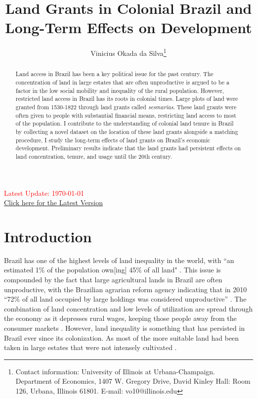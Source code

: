 \documentclass{article}
\title{Land Grants in Colonial Brazil and Long-Term Effects on Development}
\author{Vinicius Okada da Silva\thanks{Contact information: University of Illinois at Urbana-Champaign. Department of Economics, 1407 W. Gregory Drive, David Kinley Hall: Room 126, Urbana, Illinois 61801. E-mail: vo10@illinois.edu}}
\affil{Department of Economics, University of Illinois at Urbana-Champaign}
\date{}
\begin{document}
\maketitle
\thispagestyle{empty} 

\vspace{-.1cm}
\begin{center}
  \textcolor{red}{Latest Update: \today}
  \\
  \href{https://viniokadasilva.github.io/Papers/Sesmarias/02.Draft/02.Second_Draft/Sesmarias_Paper.pdf}{Click here for the Latest Version}
\end{center}
\vspace{.1cm}

\begin{abstract}
  Land access in Brazil has been a key political issue for the past century. The concentration of land in large estates that are often unproductive is argued to be a factor in the low social mobility and inequality of the rural population. However, restricted land access in Brazil has its roots in colonial times. Large plots of land were granted from 1530-1822 through land grants called \textit{sesmarias}. These land grants were often given to people with substantial financial means, restricting land access to most of the population. I contribute to the understanding of colonial land tenure in Brazil by collecting a novel dataset on the location of these land grants alongside a matching procedure, I study the long-term effects of land grants on Brazil's economic development. Preliminary results indicate that the land grants had persistent effects on land concentration, tenure, and usage until the 20th century.
\end{abstract}

\clearpage
{} 

\section{Introduction}

Brazil has one of the highest levels of land inequality in the world, with ``an estimated 1\% of the population own[ing] 45\% of all land" \parencite{Usaid2016-xs}. 
This issue is compounded by the fact that large agricultural lands in Brazil are often unproductive, with the Brazilian agrarian reform agency indicating that in 2010 ``72\% of all land occupied by large holdings was considered unproductive'' \parencite{Carlson2019-mk}.
The combination of land concentration and low levels of utilization are spread through the economy as it depresses rural wages, keeping those people away from the consumer markets \parencite[p.~1]{De_Oliveira_Andrade1980-xz}.
However, land inequality is something that has persisted in Brazil ever since its colonization.
As most of the more suitable land had been taken in large estates that were not intensely cultivated \parencite[p.~53]{Mueller1995-gi}. 
\end{document}
